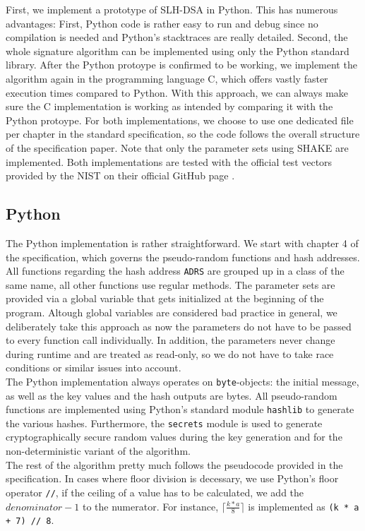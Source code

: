 \documentclass[journal=tosc,notanonymous]{iacrtrans}
\begin{document}
First, we implement a prototype of SLH-DSA in Python.
This has numerous advantages: First, Python code is rather easy to run and debug since no compilation is needed and Python's stacktraces are really detailed.
Second, the whole signature algorithm can be implemented using only the Python standard library.
After the Python protoype is confirmed to be working, we implement the algorithm again in the programming language C, which offers vastly faster execution times compared to Python.
With this approach, we can always make sure the C implementation is working as intended by comparing it with the Python protoype.
For both implementations, we choose to use one dedicated file per chapter in the standard specification, so the code follows the overall structure of the specification paper.
Note that only the parameter sets using SHAKE are implemented.
Both implementations are tested with the official test vectors provided by the NIST on their official GitHub page \cite{usnistgov-2024}.


\subsection{Python}

The Python implementation is rather straightforward.
We start with chapter 4 of the specification, which governs the pseudo-random functions and hash addresses.
All functions regarding the hash address \texttt{ADRS} are grouped up in a class of the same name, all other functions use regular methods.
The parameter sets are provided via a global variable that gets initialized at the beginning of the program.
Altough global variables are considered bad practice in general, we deliberately take this approach as now the parameters do not have to be passed to every function call individually.
In addition, the parameters never change during runtime and are treated as read-only, so we do not have to take race conditions or similar issues into account.
\\
The Python implementation always operates on \texttt{byte}-objects: the initial message, as well as the key values and the hash outputs are bytes.
All pseudo-random functions are implemented using Python's standard module \texttt{hashlib} to generate the various hashes.
Furthermore, the \texttt{secrets} module is used to generate cryptographically secure random values during the key generation and for the non-deterministic variant of the algorithm.
\\
The rest of the algorithm pretty much follows the pseudocode provided in the specification.
In cases where floor division is decessary, we use Python's floor operator \texttt{//}, if the ceiling of a value has to be calculated, we add the $denominator - 1$ to the numerator.
For instance, $\lceil \frac{k * a}{8} \rceil$ is implemented as \texttt{(k * a + 7) // 8}.
\end{document}
